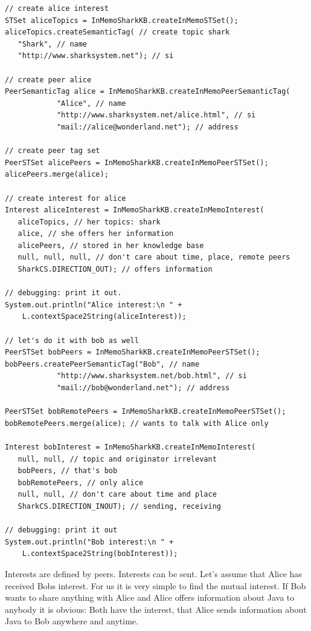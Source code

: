 \begin{verbatim}
// create alice interest
STSet aliceTopics = InMemoSharkKB.createInMemoSTSet();
aliceTopics.createSemanticTag( // create topic shark
   "Shark", // name
   "http://www.sharksystem.net"); // si

// create peer alice
PeerSemanticTag alice = InMemoSharkKB.createInMemoPeerSemanticTag(
            "Alice", // name
            "http://www.sharksystem.net/alice.html", // si
            "mail://alice@wonderland.net"); // address

// create peer tag set
PeerSTSet alicePeers = InMemoSharkKB.createInMemoPeerSTSet();
alicePeers.merge(alice);

// create interest for alice
Interest aliceInterest = InMemoSharkKB.createInMemoInterest(
   aliceTopics, // her topics: shark
   alice, // she offers her information
   alicePeers, // stored in her knowledge base
   null, null, null, // don't care about time, place, remote peers
   SharkCS.DIRECTION_OUT); // offers information

// debugging: print it out.
System.out.println("Alice interest:\n " + 
    L.contextSpace2String(aliceInterest));

// let's do it with bob as well
PeerSTSet bobPeers = InMemoSharkKB.createInMemoPeerSTSet();
bobPeers.createPeerSemanticTag("Bob", // name
            "http://www.sharksystem.net/bob.html", // si
            "mail://bob@wonderland.net"); // address

PeerSTSet bobRemotePeers = InMemoSharkKB.createInMemoPeerSTSet();
bobRemotePeers.merge(alice); // wants to talk with Alice only

Interest bobInterest = InMemoSharkKB.createInMemoInterest(
   null, null, // topic and originator irrelevant
   bobPeers, // that's bob
   bobRemotePeers, // only alice 
   null, null, // don't care about time and place
   SharkCS.DIRECTION_INOUT); // sending, receiving

// debugging: print it out
System.out.println("Bob interest:\n " + 
    L.contextSpace2String(bobInterest));
\end{verbatim}

Interests are defined by peers. Interests can be sent. Let's assume that Alice has received Bobs interest. For us it is very simple to find the mutual interest. If Bob wants to share anything with Alice and Alice offers information about Java to anybody it is obvious: Both have the interest, that Alice sends information about Java to Bob anywhere and anytime.

